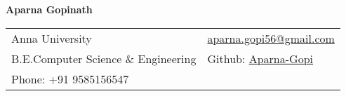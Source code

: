 \documentclass[letterpaper,11pt,oneside]{article}
\newcommand*{\Github}{\href{https://github.com/Aparna-Gopi}{Aparna-Gopi}}
\newcommand{\Absender}[1][\normalsize]{\Github}
\begin{document}

\noindent  \LARGE{\textbf{Aparna Gopinath}}  \\
\vspace{-2ex}
\hline
\normalsize


\begin{center}
\begin{tabular}{l l}
 Anna University    & \hspace{1in} \href{mailto:aparna.gopi56@gmail.com}{aparna.gopi56@gmail.com} \\
 B.E.Computer Science \& Engineering  & \hspace{1in} Github: \Absender        \\
  Phone: +91 9585156547 \\
\end{tabular}
\end{center}

\vspace{1em}

\end{document}
